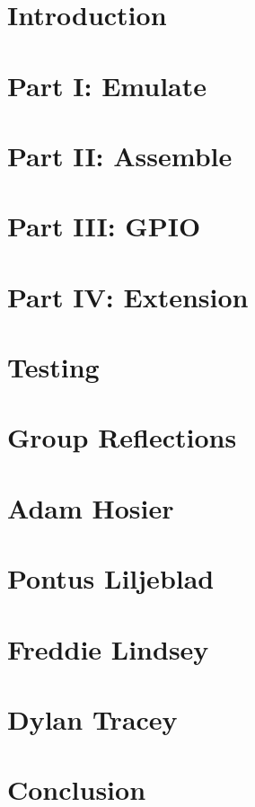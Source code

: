 \documentclass[11pt]{article}
\begin{document}


\maketitle

\section{Introduction}



\section{Part I: Emulate}



\section{Part II: Assemble}
  


\section{Part III: GPIO}


  
\section{Part IV: Extension}



\section{Testing}



\section{Group Reflections}



\section{Adam Hosier}



\section{Pontus Liljeblad}



\section{Freddie Lindsey}



\section{Dylan Tracey}



\section{Conclusion}


\end{document}
